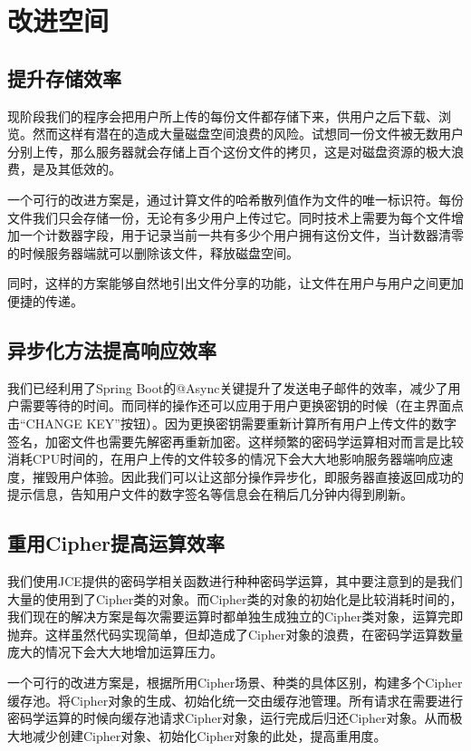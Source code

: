 
\chapter{改进空间}

\section{提升存储效率}

现阶段我们的程序会把用户所上传的每份文件都存储下来，供用户之后下载、浏览。然而这样有潜在的造成大量磁盘空间浪费的风险。试想同一份文件被无数用户分别上传，那么服务器就会存储上百个这份文件的拷贝，这是对磁盘资源的极大浪费，是及其低效的。

一个可行的改进方案是，通过计算文件的哈希散列值作为文件的唯一标识符。每份文件我们只会存储一份，无论有多少用户上传过它。同时技术上需要为每个文件增加一个计数器字段，用于记录当前一共有多少个用户拥有这份文件，当计数器清零的时候服务器端就可以删除该文件，释放磁盘空间。

同时，这样的方案能够自然地引出文件分享的功能，让文件在用户与用户之间更加便捷的传递。

\section{异步化方法提高响应效率}

我们已经利用了Spring Boot的@Async关键提升了发送电子邮件的效率，减少了用户需要等待的时间。而同样的操作还可以应用于用户更换密钥的时候（在主界面点击“CHANGE KEY”按钮）。因为更换密钥需要重新计算所有用户上传文件的数字签名，加密文件也需要先解密再重新加密。这样频繁的密码学运算相对而言是比较消耗CPU时间的，在用户上传的文件较多的情况下会大大地影响服务器端响应速度，摧毁用户体验。因此我们可以让这部分操作异步化，即服务器直接返回成功的提示信息，告知用户文件的数字签名等信息会在稍后几分钟内得到刷新。

\section{重用Cipher提高运算效率}

我们使用JCE提供的密码学相关函数进行种种密码学运算，其中要注意到的是我们大量的使用到了Cipher类的对象。而Cipher类的对象的初始化是比较消耗时间的，我们现在的解决方案是每次需要运算时都单独生成独立的Cipher类对象，运算完即抛弃。这样虽然代码实现简单，但却造成了Cipher对象的浪费，在密码学运算数量庞大的情况下会大大地增加运算压力。

一个可行的改进方案是，根据所用Cipher场景、种类的具体区别，构建多个Cipher缓存池。将Cipher对象的生成、初始化统一交由缓存池管理。所有请求在需要进行密码学运算的时候向缓存池请求Cipher对象，运行完成后归还Cipher对象。从而极大地减少创建Cipher对象、初始化Cipher对象的此处，提高重用度。